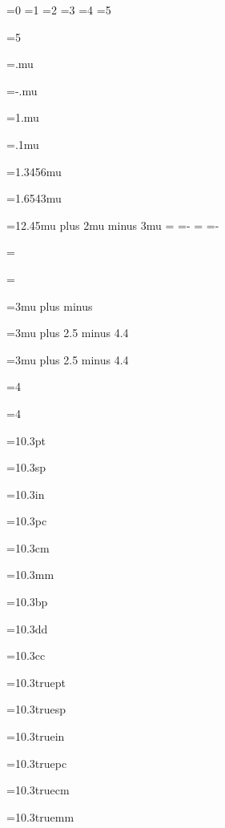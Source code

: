 =0
=1
=2
=3
=4
=5

=5
\showthe{}

=.mu
\showthe{}

=-.mu
\showthe{}

=1.mu
\showthe{}

=.1mu
\showthe{}

=1.3456mu
\showthe{}

=1.6543mu
\showthe{}

=12.45mu plus 2mu minus 3mu
\showthe{}
=
\showthe{}
=-
\showthe{}
=
\showthe{}
=-
\showthe{}

=
\showthe{}

=
\showthe{}

=3mu plus  minus 
\showthe{}

=3mu plus 2.5 minus 4.4
\showthe{}

=3mu plus 2.5 minus 4.4
\showthe{}

=4
\showthe{}

=4
\showthe{}

=10.3pt
\showthe{}

=10.3sp
\showthe{}

=10.3in
\showthe{}

=10.3pc
\showthe{}

=10.3cm
\showthe{}

=10.3mm
\showthe{}

=10.3bp
\showthe{}

=10.3dd
\showthe{}

=10.3cc
\showthe{}


=10.3truept
\showthe{}

=10.3truesp
\showthe{}

=10.3truein
\showthe{}

=10.3truepc
\showthe{}

=10.3truecm
\showthe{}

=10.3truemm
\showthe{}

